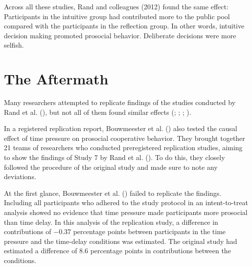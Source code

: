 \documentclass[
  letterpaper,
]{book}
\begin{document}
Across all these studies, Rand and colleagues (2012) found the same
effect: Participants in the intuitive group had contributed more to the
public pool compared with the participants in the reflection group. In
other words, intuitive decision making promoted prosocial behavior.
Deliberate decisions were more selfish.

\section{The Aftermath}\label{the-aftermath-19}

Many researchers attempted to replicate findings of the studies
conducted by Rand et al. (),
but not all of them found similar effects
(;
;
;
).

In a registered replication report, Bouwmeester et al.
() also tested the
causal effect of time pressure on prosocial cooperative behavior. They
brought together 21 teams of researchers who conducted preregistered
replication studies, aiming to show the findings of Study 7 by Rand et
al. (). To do this, they
closely followed the procedure of the original study and made sure to
note any deviations.

At the first glance, Bouwmeester et al.
() failed to replicate
the findings. Including all participants who adhered to the study
protocol in an intent-to-treat analysis showed no evidence that time
pressure made participants more prosocial than time delay. In this
analysis of the replication study, a difference in contributions of
−0.37 percentage points between participants in the time pressure and
the time-delay conditions was estimated. The original study had
estimated a difference of 8.6 percentage points in contributions between
the conditions.
\end{document}

